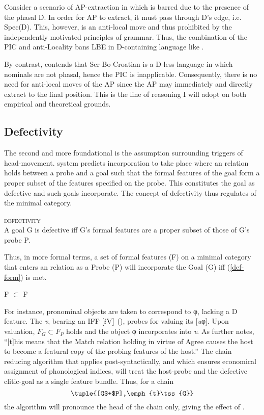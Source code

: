 \documentclass[output=paper]{langsci/langscibook}
\begin{document}
Consider a scenario of AP-extraction in  which is barred due to the
presence of the phasal D. In order for AP to extract, it must pass through D's
edge, i.e. Spec(D). This, however, is an anti-local move and thus
prohibited by the independently motivated principles of grammar. Thus, the
combination of the PIC and anti-Locality bans \gls{LBE} in D-containing language like .

By contrast, \citet{Boskovic:2005,Boskovic2008} contends that
Ser-Bo-Croatian is a D-less language in which nominals are not phasal, hence
the PIC is inapplicable. Consequently, there is no need for anti-local moves of
the AP since the AP may immediately and directly extract to the final position.
This is the line of reasoning I will adopt on both empirical and theoretical
grounds.

\subsection{Defectivity}\label{subsec:def}

The second and more foundational is the assumption surrounding triggers of
head-movement.  system predicts
incorporation to take place where an  relation holds between a probe
and a goal such that the formal features of the goal form a proper subset of
the features specified on the probe. This constitutes the goal as defective and
such goals incorporate.  The concept of defectivity thus regulates
 of the minimal category.

\begin{exe}
\ex \textsc{defectivity} \citep{Roberts2010}\\
A goal G is defective iff G's formal features are a proper subset of those of G's probe P.
\end{exe}

Thus, in more formal terms, a set of formal features (F) on a minimal category
that enters an  relation as a Probe (P) will incorporate the Goal
(G) iff (\ref{def-form}) is met.

\begin{exe}
    \ex F $\subset$ F
\label{def-form}
\end{exe}

For instance,  pronominal objects  are taken to
correspond to φ, lacking a D feature. The \emph{v},
bearing an \gls{IFF} $[i\textsc{V}]$ (),  probes
for valuing its [\emph{u}φ]. Upon valuation, $F_G \subset F_P$ holds and the
object φ incorporates into \emph{v}. As
\citet[391]{roberts:2012uq} further notes, ``[t]his means that the Match
relation holding in virtue of Agree causes the host to become a featural copy
of the probing features of the host.'' The chain reducing algorithm that
applies post-syntactically, and which ensures economical assignment of
phonological indices, will treat the host-probe and the defective clitic-goal
as a single feature bundle. Thus, for a chain \[\tuple{[G$+$P],\emph{t}\tss{G}}\]
the algorithm will pronounce the head of the chain only, giving the effect of
.
\end{document}
